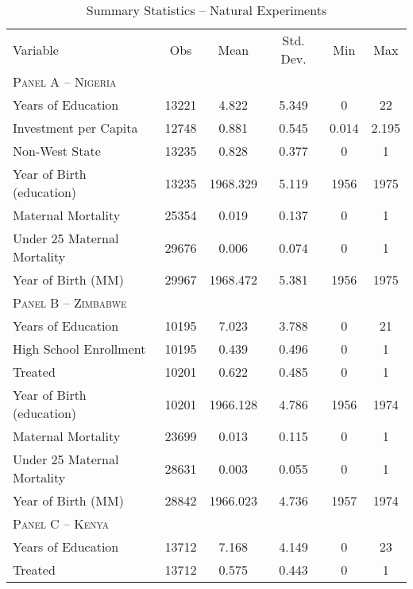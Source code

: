 \begin{subtables}



\begin{table}[htpb!]											
\begin{center}											
\caption{Summary Statistics – Natural Experiments}											
\label{MMRtab:sumstatsexperiment}											
\begin{tabular}{l c c c c c}											
& & & & & \\											
\toprule											
Variable	&	Obs	&	Mean	&	Std. Dev.	&	Min	&	Max	\\
\midrule
\multicolumn{6}{l}{\textsc{Panel A – Nigeria}}  \\											
Years of Education	&	13221	&	4.822	&	5.349	&	0	&	22	\\
Investment per Capita	&	12748	&	0.881	&	0.545	&	0.014	&	2.195	\\
Non-West State	&	13235	&	0.828	&	0.377	&	0	&	1	\\
Year of Birth (education)	&	13235	&	1968.329	&	5.119	&	1956	&	1975	\\
Maternal Mortality	&	25354	&	0.019	&	0.137	&	0	&	1	\\
Under 25 Maternal Mortality	&	29676	&	0.006	&	0.074	&	0	&	1	\\
Year of Birth (MM)	&	29967	&	1968.472	&	5.381	&	1956	&	1975	\\
\midrule											
\multicolumn{6}{l}{\textsc{Panel B – Zimbabwe}}  \\											
Years of Education	&	10195	&	7.023	&	3.788	&	0	&	21	\\
High School Enrollment	&	10195	&	0.439	&	0.496	&	0	&	1	\\
Treated	&	10201	&	0.622	&	0.485	&	0	&	1	\\
Year of Birth (education)	&	10201	&	1966.128	&	4.786	&	1956	&	1974	\\
Maternal Mortality	&	23699	&	0.013	&	0.115	&	0	&	1	\\
Under 25 Maternal Mortality	&	28631	&	0.003	&	0.055	&	0	&	1	\\
Year of Birth (MM)	&	28842	&	1966.023	&	4.736	&	1957	&	1974	\\
\midrule											
\multicolumn{6}{l}{\textsc{Panel C – Kenya}}  \\											
Years of Education	&	13712	&	7.168	&	4.149	&	0	&	23	\\
Treated	&	13712	&	0.575	&	0.443	&	0	&	1	\\

\end{tabular}
\end{center}
\end{table}
\end{subtables}
